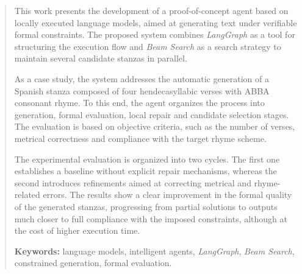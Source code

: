 \documentclass[12pt,a4paper,twoside,openright]{book}
\begin{document}
\renewcommand{\abstractname}{Abstract}
\begin{abstract}
\setlength{\parindent}{0pt}
\setlength{\parskip}{0.6em}

This work presents the development of a proof-of-concept agent based on locally executed language models, aimed at generating text under verifiable formal constraints.
The proposed system combines \emph{LangGraph} as a tool for structuring the execution flow and \emph{Beam Search} as a search strategy to maintain several candidate stanzas in parallel.

As a case study, the system addresses the automatic generation of a Spanish stanza composed of four hendecasyllabic verses with ABBA consonant rhyme. To this end, the agent organizes the process into generation, formal evaluation, local repair and candidate selection stages.
The evaluation is based on objective criteria, such as the number of verses, metrical correctness and compliance with the target rhyme scheme.

The experimental evaluation is organized into two cycles. The first one establishes a baseline without explicit repair mechanisms, whereas the second introduces refinements aimed at correcting metrical and rhyme-related errors.
The results show a clear improvement in the formal quality of the generated stanzas, progressing from partial solutions to outputs much closer to full compliance with the imposed constraints, although at the cost of higher execution time.

\medskip

\noindent \textbf{Keywords:} language models, intelligent agents, \emph{LangGraph}, \emph{Beam Search}, constrained generation, formal evaluation.
\end{abstract}

\end{document}
